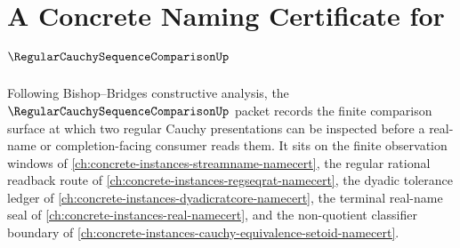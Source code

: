 \chapter{A Concrete Naming Certificate for $\RegularCauchySequenceComparisonUp$}
\label{ch:concrete-instances-regular-cauchy-sequence-comparison-namecert}

Following Bishop--Bridges constructive analysis, the $\RegularCauchySequenceComparisonUp$ packet records the finite comparison surface at which two regular Cauchy presentations can be inspected before a real-name or completion-facing consumer reads them. It sits on the finite observation windows of \autoref{ch:concrete-instances-streamname-namecert}, the regular rational readback route of \autoref{ch:concrete-instances-regseqrat-namecert}, the dyadic tolerance ledger of \autoref{ch:concrete-instances-dyadicratcore-namecert}, the terminal real-name seal of \autoref{ch:concrete-instances-real-namecert}, and the non-quotient classifier boundary of \autoref{ch:concrete-instances-cauchy-equivalence-setoid-namecert}.


